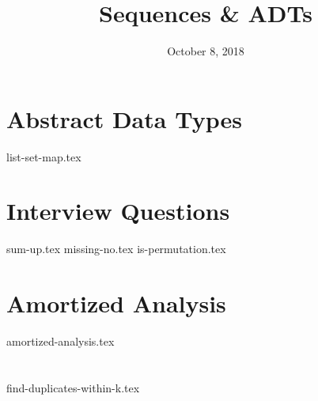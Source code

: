 \documentclass[11pt]{exam}
\title{Sequences \& ADTs}
\date{October 8, 2018}
\begin{document}
\maketitle

\section{Abstract Data Types}
{list-set-map.tex}

\clearpage

\section{Interview Questions}
\begin{questions}
{sum-up.tex}
{missing-no.tex}
{is-permutation.tex}
\end{questions}

\clearpage

\section{Amortized Analysis}
\begin{questions}
{amortized-analysis.tex}
\end{questions}

\section{}
\begin{questions}
{find-duplicates-within-k.tex}
\end{questions}
\end{document}

